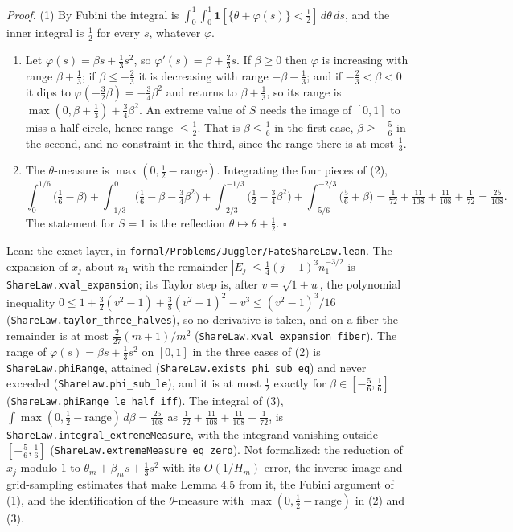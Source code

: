 \documentclass[11pt,a4paper]{article}
\begin{document}
\emph{Proof.} (1) By Fubini the integral is
\(\int_0^1\!\int_0^1\mathbf 1[\{\theta+\varphi(s)\}<\tfrac12]\,d\theta\,ds\),
and the inner integral is \(\tfrac12\) for every \(s\), whatever
\(\varphi\).

\begin{enumerate}
\def\labelenumi{(\arabic{enumi})}
\setcounter{enumi}{1}
\item
  Let \(\varphi(s)=\beta s+\tfrac13s^2\), so
  \(\varphi'(s)=\beta+\tfrac23s\). If \(\beta\ge0\) then \(\varphi\) is
  increasing with range \(\beta+\tfrac13\); if \(\beta\le-\tfrac23\) it
  is decreasing with range \(-\beta-\tfrac13\); and if
  \(-\tfrac23<\beta<0\) it dips to
  \(\varphi(-\tfrac32\beta)=-\tfrac34\beta^2\) and returns to
  \(\beta+\tfrac13\), so its range is
  \(\max(0,\beta+\tfrac13)+\tfrac34\beta^2\). An extreme value of \(S\)
  needs the image of \([0,1]\) to miss a half-circle, hence range
  \(\le\tfrac12\). That is \(\beta\le\tfrac16\) in the first case,
  \(\beta\ge-\tfrac56\) in the second, and no constraint in the third,
  since the range there is at most \(\tfrac13\).
\item
  The \(\theta\)-measure is \(\max(0,\tfrac12-\text{range})\).
  Integrating the four pieces of (2), \[
  \int_0^{1/6}\!\!\bigl(\tfrac16-\beta\bigr)
  +\int_{-1/3}^0\!\!\bigl(\tfrac16-\beta-\tfrac34\beta^2\bigr)
  +\int_{-2/3}^{-1/3}\!\!\bigl(\tfrac12-\tfrac34\beta^2\bigr)
  +\int_{-5/6}^{-2/3}\!\!\bigl(\tfrac56+\beta\bigr)
  =\tfrac1{72}+\tfrac{11}{108}+\tfrac{11}{108}+\tfrac1{72}
  =\tfrac{25}{108}.
  \] The statement for \(S=1\) is the reflection
  \(\theta\mapsto\theta+\tfrac12\). \(\square\)
\end{enumerate}

Lean: the exact layer, in
\texttt{\nolinkurl{formal/Problems/Juggler/FateShareLaw.lean}}. The
expansion of \(x_j\) about \(n_1\) with the remainder
\(|E_j|\le\tfrac14(j-1)^3n_1^{-3/2}\) is
\texttt{\nolinkurl{ShareLaw.xval_expansion}}; its Taylor step is, after
\(v=\sqrt{1+u}\), the polynomial inequality
\(0\le1+\tfrac32(v^2-1)+\tfrac38(v^2-1)^2-v^3\le(v^2-1)^3/16\)
(\texttt{\nolinkurl{ShareLaw.taylor_three_halves}}), so no derivative is
taken, and on a fiber the remainder is at most \(\tfrac2{27}(m+1)/m^2\)
(\texttt{\nolinkurl{ShareLaw.xval_expansion_fiber}}). The range of
\(\varphi(s)=\beta s+\tfrac13s^2\) on \([0,1]\) in the three cases of
(2) is \texttt{\nolinkurl{ShareLaw.phiRange}}, attained
(\texttt{\nolinkurl{ShareLaw.exists_phi_sub_eq}}) and never exceeded
(\texttt{\nolinkurl{ShareLaw.phi_sub_le}}), and it is at most
\(\tfrac12\) exactly for \(\beta\in[-\tfrac56,\tfrac16]\)
(\texttt{\nolinkurl{ShareLaw.phiRange_le_half_iff}}). The integral of
(3), \(\int\max(0,\tfrac12-\text{range})\,d\beta=\tfrac{25}{108}\) as
\(\tfrac1{72}+\tfrac{11}{108}+\tfrac{11}{108}+\tfrac1{72}\), is
\texttt{\nolinkurl{ShareLaw.integral_extremeMeasure}}, with the
integrand vanishing outside \([-\tfrac56,\tfrac16]\)
(\texttt{\nolinkurl{ShareLaw.extremeMeasure_eq_zero}}). Not formalized:
the reduction of \(x_j\) modulo \(1\) to
\(\theta_m+\beta_ms+\tfrac13s^2\) with its \(O(1/H_m)\) error, the
inverse-image and grid-sampling estimates that make Lemma 4.5 from it,
the Fubini argument of (1), and the identification of the
\(\theta\)-measure with \(\max(0,\tfrac12-\text{range})\) in (2) and
(3).
\end{document}
